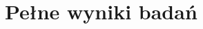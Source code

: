 \documentclass[../FM_mgr.tex]{subfiles}
\begin{document}
\appendix \chapter{Pełne wyniki badań} \label{appendix:full_results}
\end{document}

